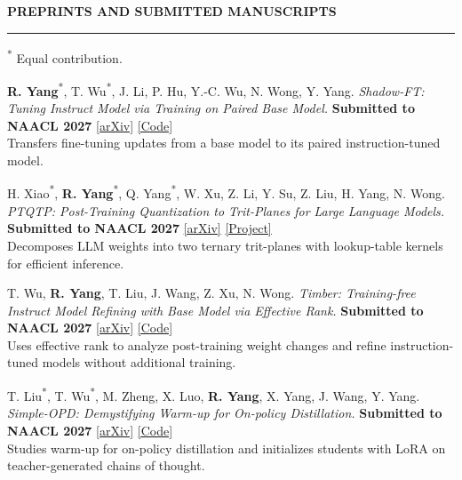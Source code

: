 \documentclass[11pt,a4paper]{article}
\newcommand{\submissionbadge}[1]{\begingroup\setlength{\fboxsep}{1.5pt}\colorbox{submissionfill}{\textcolor{venuetext}{\bfseries #1}}\endgroup}
\newenvironment{rSection}[1]{
  \Needspace{7\baselineskip}\medskip
  \textbf{#1}\smallskip\hrule\smallskip
}{\par}
\begin{document}
\begin{rSection}{PREPRINTS AND SUBMITTED MANUSCRIPTS}\small\raggedright
\textsuperscript{*} Equal contribution.
\begin{enumerate}[label={[P\arabic*]}]
\item\begin{samepage} \textbf{R. Yang}\textsuperscript{*}, T. Wu\textsuperscript{*}, J. Li, P. Hu, Y.-C. Wu, N. Wong, Y. Yang. \textit{Shadow-FT: Tuning Instruct Model via Training on Paired Base Model.} \submissionbadge{Submitted to NAACL 2027} \href{https://arxiv.org/abs/2505.12716}{[arXiv]} \href{https://github.com/wutaiqiang/Shadow-FT}{[Code]}\\[1pt]{\textcolor{summarytext}{Transfers fine-tuning updates from a base model to its paired instruction-tuned model.}}\par\end{samepage}
\item\begin{samepage} H. Xiao\textsuperscript{*}, \textbf{R. Yang}\textsuperscript{*}, Q. Yang\textsuperscript{*}, W. Xu, Z. Li, Y. Su, Z. Liu, H. Yang, N. Wong. \textit{PTQTP: Post-Training Quantization to Trit-Planes for Large Language Models.} \submissionbadge{Submitted to NAACL 2027} \href{https://arxiv.org/abs/2509.16989}{[arXiv]} \href{https://github.com/HeXiao-55/PTQTP}{[Project]}\\[1pt]{\textcolor{summarytext}{Decomposes LLM weights into two ternary trit-planes with lookup-table kernels for efficient inference.}}\par\end{samepage}
\item\begin{samepage} T. Wu, \textbf{R. Yang}, T. Liu, J. Wang, Z. Xu, N. Wong. \textit{Timber: Training-free Instruct Model Refining with Base Model via Effective Rank.} \submissionbadge{Submitted to NAACL 2027} \href{https://arxiv.org/abs/2509.23595}{[arXiv]} \href{https://github.com/wutaiqiang/Timber}{[Code]}\\[1pt]{\textcolor{summarytext}{Uses effective rank to analyze post-training weight changes and refine instruction-tuned models without additional training.}}\par\end{samepage}
\item\begin{samepage} T. Liu\textsuperscript{*}, T. Wu\textsuperscript{*}, M. Zheng, X. Luo, \textbf{R. Yang}, X. Yang, J. Wang, Y. Yang. \textit{Simple-OPD: Demystifying Warm-up for On-policy Distillation.} \submissionbadge{Submitted to NAACL 2027} \href{https://arxiv.org/abs/2608.06802}{[arXiv]} \href{https://github.com/Utaotao/Simple-OPD}{[Code]}\\[1pt]{\textcolor{summarytext}{Studies warm-up for on-policy distillation and initializes students with LoRA on teacher-generated chains of thought.}}\par\end{samepage}

\end{enumerate}
\end{rSection}
\end{document}
